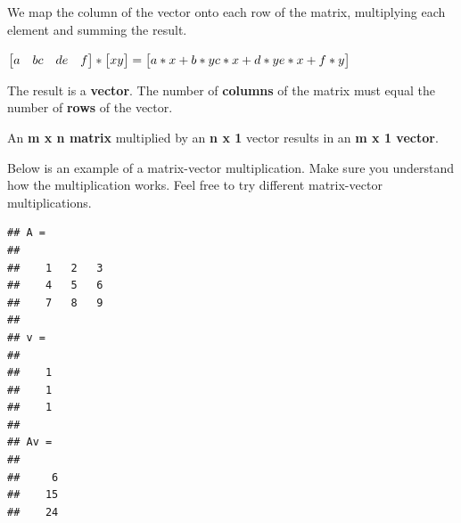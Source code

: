 \documentclass[
]{article}
\newenvironment{Shaded}{\begin{snugshade}}{\end{snugshade}}
\newcommand{\CommentTok}[1]{\textcolor[rgb]{0.56,0.35,0.01}{\textit{#1}}}
\newcommand{\FloatTok}[1]{\textcolor[rgb]{0.00,0.00,0.81}{#1}}
\newcommand{\NormalTok}[1]{#1}
\newcommand{\OperatorTok}[1]{\textcolor[rgb]{0.81,0.36,0.00}{\textbf{#1}}}
\begin{document}
We map the column of the vector onto each row of the matrix, multiplying
each element and summing the result.

\(\begin{bmatrix} a & b \newline c & d \newline e & f \end{bmatrix} *\begin{bmatrix} x \newline y \newline \end{bmatrix} =\begin{bmatrix} a*x + b*y \newline c*x + d*y \newline e*x + f*y\end{bmatrix}\)

The result is a \textbf{vector}. The number of \textbf{columns} of the
matrix must equal the number of \textbf{rows} of the vector.

An \textbf{m x n matrix} multiplied by an \textbf{n x 1} vector results
in an \textbf{m x 1 vector}.

Below is an example of a matrix-vector multiplication. Make sure you
understand how the multiplication works. Feel free to try different
matrix-vector multiplications.

\begin{Shaded}
\end{Shaded}

\begin{verbatim}
## A =
## 
##    1   2   3
##    4   5   6
##    7   8   9
## 
## v =
## 
##    1
##    1
##    1
## 
## Av =
## 
##     6
##    15
##    24
\end{verbatim}
\end{document}
